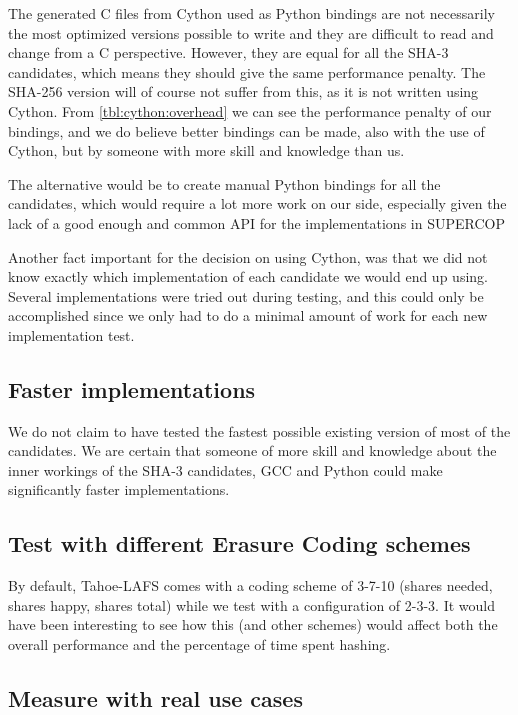 \documentclass[english,12pt,a4paper]{book}
\begin{document}
The generated C files from Cython used as Python bindings are not necessarily
the most optimized versions possible to write and they are difficult to read and
change from a C perspective. However, they are equal for all the \ac{SHA}-3
candidates, which means they should give the same performance penalty. The
\ac{SHA}-256 version will of course not suffer from this, as it is not written
using Cython. From \autoref{tbl:cython:overhead} we can see the performance
penalty of our bindings, and we do believe better bindings can be made, also
with the use of Cython, but by someone with more skill and knowledge than us.

The alternative would be to create manual Python bindings for all the
candidates, which would require a lot more work on our side, especially given
the lack of a good enough and common \ac{API} for the implementations in
\ac{SUPERCOP}

Another fact important for the decision on using Cython, was that we did not
know exactly which implementation of each candidate we would end up using.
Several implementations were tried out during testing, and this could only be
accomplished since we only had to do a minimal amount of work for each new
implementation test.

\subsection{Faster implementations}

We do not claim to have tested the fastest possible existing version
of most of the candidates. We are certain that someone of more skill and
knowledge about the inner workings of the \ac{SHA}-3 candidates, \ac{GCC} and
Python could make significantly faster implementations.

\subsection{Test with different Erasure Coding schemes}

By default, Tahoe-\ac{LAFS} comes with a coding scheme of 3-7-10 (shares needed,
shares happy, shares total) while we test with a configuration of 2-3-3. It
would have been interesting to see how this (and other schemes) would affect
both the overall performance and the percentage of time spent hashing.

\subsection{Measure with real use cases}
\end{document}
